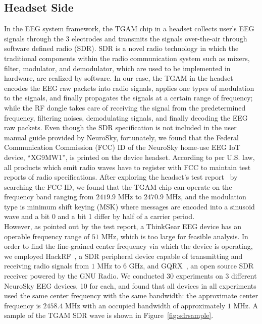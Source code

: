 \subsection{Headset Side}
In the EEG system framework, the TGAM chip in a headset collects user's EEG signals through the 3 electrodes and transmits the signals over-the-air through software defined radio (SDR). SDR is a novel radio technology in which the traditional components within the radio communication system such as mixers, filter, modulator, and demodulator, which are used to be implemented in hardware, are realized by software. In our case, the TGAM in the headset encodes the EEG raw packets into radio signals, applies one types of modulation to the signals, and finally propagates the signals at a certain range of frequency; while the RF dongle takes care of receiving the signal from the predetermined frequency, filtering noises, demodulating signals, and finally decoding the EEG raw packets. Even though the SDR specification is not included in the user manual guide provided by NeuroSky, fortunately, we found that the Federal Communication Commission (FCC) ID of the NeuroSky home-use EEG IoT device, ``XG9MW1'', is printed on the device headset. According to per U.S. law, all products which emit radio waves have to register with FCC to maintain test reports of radio specifications. After exploring the headset's test report~\cite{testreport} by searching the FCC ID, we found that the TGAM chip can operate on the frequency band ranging from $2419.9$ MHz to $2470.9$ MHz, and the modulation type is minimum shift keying (MSK) where messages are encoded into a sinusoid wave and a bit 0 and a bit 1 differ by half of a carrier period. %
\\
%
\indent However, as pointed out by the test report, a ThinkGear EEG device has an operable frequency range of $51$ MHz, which is too large for feasible analysis. In order to find the fine-grained center frequency via which the device is operating, we employed HackRF~\cite{gadgetshackrf}, a SDR peripheral device capable of transmitting and receiving radio signals from $1$ MHz to $6$ GHz, and GQRX~\cite{gqrx}, an open source SDR receiver powered by the GNU Radio. We conducted 30 experiments on 3 different NeuroSky EEG devices, 10 for each, and found that all devices in all experiments used the same center frequency with the same bandwidth: the approximate center frequency is $2458.4$ MHz with an occupied bandwidth of approximately $1$ MHz. A sample of the TGAM SDR wave is shown in Figure~\ref{fig:sdrsample}.\\
